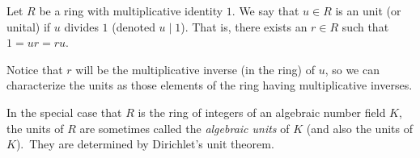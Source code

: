 \documentclass{article}
\begin{document}
Let $R$ be a ring with multiplicative identity $1$. We say that $u\in R$ is an unit (or unital) if $u$ divides $1$ (denoted $u \mid 1$). That is, there exists an $r\in R$  such that $1=ur=ru$.

Notice that $r$ will be the multiplicative inverse (in the ring) of $u$, so we can characterize the units as those elements of the ring having multiplicative inverses.

In the special case  that $R$ is the ring of integers of an algebraic number field $K$, the units of $R$ are sometimes called the {\em algebraic units} of $K$ (and also the units of $K$).\, They are determined by Dirichlet's unit theorem.
\end{document}
